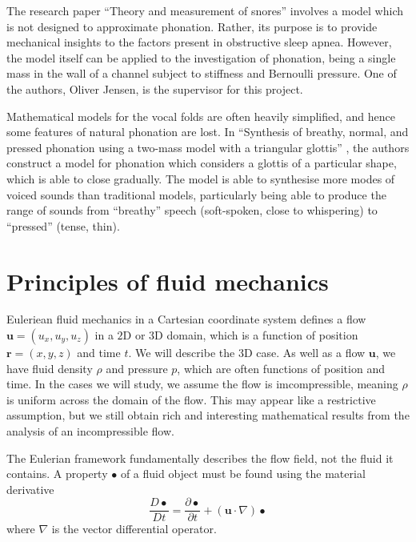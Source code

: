 \documentclass{report}
\begin{document}
The research paper ``Theory and measurement of snores'' \cite[1993]{gavriely_jensen_1993} involves a model which is not designed to approximate phonation.
Rather, its purpose is to provide mechanical insights to the factors present in obstructive sleep apnea.
However, the model itself can be applied to the investigation of phonation,
being a single mass in the wall of a channel subject to stiffness and Bernoulli pressure.
One of the authors, Oliver Jensen, is the supervisor for this project.

Mathematical models for the vocal folds are often heavily simplified, and hence some features of natural phonation are lost.
In ``Synthesis of breathy, normal, and pressed phonation using a two-mass model with a triangular glottis'' \cite[2011]{birkholz_2011},
the authors construct a model for phonation which considers a glottis of a particular shape, which is able to close gradually.
The model is able to synthesise more modes of voiced sounds than traditional models,
particularly being able to produce the range of sounds from ``breathy'' speech (soft-spoken, close to whispering) to ``pressed'' (tense, thin). 

\section{Principles of fluid mechanics}

Euleriean fluid mechanics in a Cartesian coordinate system defines a flow $\mathbf{u}=(u_x,u_y,u_z)$ in a $2$D or $3$D domain,
which is a function of position $\mathbf{r} = (x,y,z)$ and time $t$.
We will describe the $3$D case.
As well as a flow $\mathbf{u}$,
we have fluid density $\rho$ and pressure $p$,
which are often functions of position and time.
In the cases we will study,
we assume the flow is imcompressible,
meaning $\rho$ is uniform across the domain of the flow.
This may appear like a restrictive assumption,
but we still obtain rich and interesting mathematical results from the analysis of an incompressible flow.

The Eulerian framework fundamentally describes the flow field, not the fluid it contains.
A property $\bullet$ of a fluid object must be found using the material derivative
\begin{equation}
    \frac{D\bullet}{Dt} = \frac{\partial \bullet}{\partial t} + (\mathbf{u}\cdot \nabla)\bullet
\end{equation}
where $\nabla$ is the vector differential operator.
\end{document}
